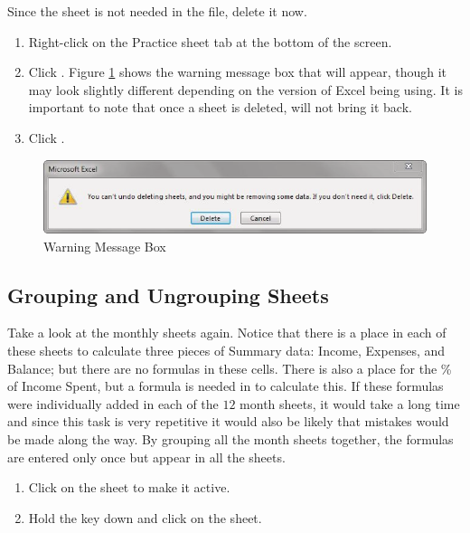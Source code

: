 Since the  sheet is not needed in the  file, delete it now.

\begin{enumerate}
	\item Right-click on the Practice sheet tab at the bottom of the screen.
	\item Click . Figure \ref{06:fig03} shows the warning message box that will appear, though it may look slightly different depending on the version of Excel being using. It is important to note that once a sheet is deleted,  will not bring it back.
	\item Click .
\end{enumerate}

\begin{figure}[H]
	\centering
	\includegraphics[width=\maxwidth{.95\linewidth}]{gfx/ch06_fig03}
	\caption{Warning Message Box}
	\label{06:fig03}
\end{figure}

\subsection{Grouping and Ungrouping Sheets}

Take a look at the monthly sheets again. Notice that there is a place in each of these sheets to calculate three pieces of Summary data: Income, Expenses, and Balance; but there are no formulas in these cells. There is also a place for the \% of Income Spent, but a formula is needed in  to calculate this. If these formulas were individually added in each of the $ 12 $ month sheets, it would take a long time and since this task is very repetitive it would also be likely that mistakes would be made along the way. By grouping all the month sheets together, the formulas are entered only once but appear in all the sheets.

\begin{enumerate}
	\item Click on the  sheet to make it active.
	\item Hold the  key down and click on the  sheet.
\end{enumerate}

